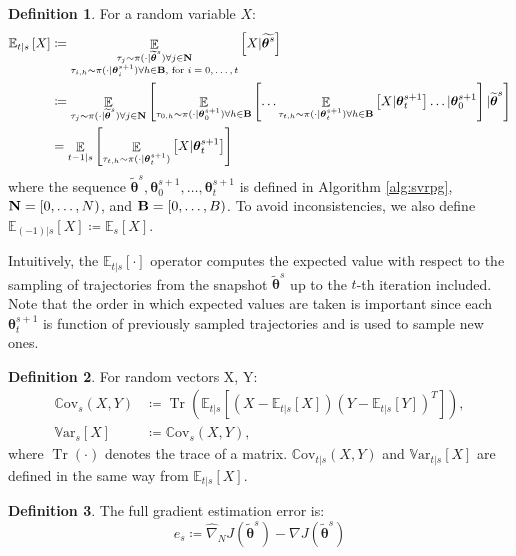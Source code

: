 \documentclass{article}
\theoremstyle{remark}
\theoremstyle{definition}
\newtheorem{definition}{Definition}[section]
\DeclareMathOperator*{\EV}{\mathbb{E}}
\DeclareMathOperator{\Tr}{Tr}
\newcommand{\EVV}[2][\ppvect \in \ppspace]{\EV_{#1}\left[{#2}\right]}
\newcommand{\vtheta}{\boldsymbol{\theta}}
\newcommand{\gradJ}[1]{\nabla J(#1)}
\newcommand{\gradApp}[2]{\widehat{\nabla}_{#2}J(#1)}
\newcommand{\Ets}[2][t]{\mathbb{E}_{#1\vert s}\left[#2\right]}
\newcommand{\Es}[1]{\mathbb{E}_{s}\left[#1\right]}
\newcommand{\Covts}[3][t]{{\mathbb{C}\text{ov}}_{#1\vert s}\left(#2,#3\right)}
\newcommand{\Covs}[2]{{\mathbb{C}\text{ov}}_{s}\left(#1,#2\right)}
\newcommand{\Varts}[2][t]{{\mathbb{V}\text{ar}}_{#1\vert s}\left[#2\right]}
\newcommand{\Vars}[1]{{\mathbb{V}\text{ar}}_{s}\left[#1\right]}
\newcommand{\wt}[1]{\widetilde{#1}}
\begin{document}
\begin{definition}
For a random variable $X$:
\begin{align*}
        \mathbb{E}_{t\vert s}\left[X\right] &\coloneqq 
		\mathop{\mathbb{E}}_{\substack{\tau_j\sim\pi(\cdot\vert\wt{\vtheta}^s)\forall j \in {\it {\bf N}} \\ \tau_{i,h}\sim\pi(\cdot\vert\vtheta^{s+1}_i) \forall h \in {\it {\bf B}}, \text{ for $i=0,\dots,t$}}}{\left[X \vert \wt{\vtheta^s}\right]} \\
	&\coloneqq \EVV[\tau_j\sim\pi(\cdot\vert\wt{\vtheta}^s)\forall j \in {\it {\bf N}}]{
			\EVV[\tau_{0,h}\sim\pi(\cdot\vert\vtheta_0^{s+1}) \forall h \in {\it {\bf B}}]
				{\dots
					\EVV[\tau_{t,h}\sim\pi(\cdot\vert\vtheta_t^{s+1})\forall h \in {\it {\bf B}}]
						{X\vert\vtheta_t^{s+1}}
				 \dots
			\vert\vtheta_0^{s+1}}
		\vert\wt{\vtheta}^s}\\
        &= \EVV[t-1|s]{\EVV[\tau_{t,h}\sim \pi(\cdot|\vtheta^{s+1}_t)]{X|\vtheta^{s+1}_t}}
\end{align*}
where the sequence $\wt{\vtheta}^s,\vtheta_0^{s+1},\dots,\vtheta_t^{s+1}$ is defined in Algorithm \ref{alg:svrpg}, ${\it {\bf N}} = [0,\dots,N)$, and ${\it {\bf B}} = [0,\dots,B)$. To avoid inconsistencies, we also define $\Ets[(-1)]{X} \coloneqq \Es{X}$.

\end{definition}
Intuitively, the $\Ets{\cdot}$ operator computes the expected value with respect to the sampling of trajectories from the snapshot $\wt{\vtheta}^s$ up to the $t$-th iteration included. Note that the order in which expected values are taken is important since each $\vtheta_{t}^{s+1}$ is function of previously sampled trajectories and is used to sample new ones.

\begin{definition}
For random vectors X, Y:
\begin{align*}
	\Covs{X}{Y} &\coloneqq \Tr\left(\Ets{(X-\Ets{X})(Y-\Ets{Y})^T}\right), \\
	\Vars{X} &\coloneqq \Covs{X}{Y},
\end{align*}
where $\Tr(\cdot)$ denotes the trace of a matrix. $\Covts[t]{X}{Y}$ and $\Varts[t]{X}$ are defined in the same way from $\Ets[t]{X}$.
\end{definition}

\begin{definition}
The full gradient estimation error is:
\[
	e_s \coloneqq \gradApp{\wt{\vtheta}^s}{N} - \gradJ{\wt{\vtheta}^s} 
\]
\end{definition}
\end{document}

